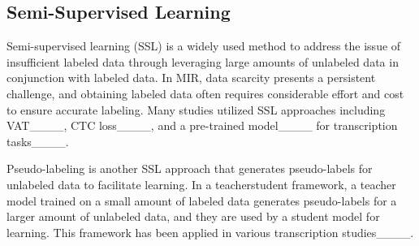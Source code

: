 \subsection{Semi-Supervised Learning}
Semi-supervised learning (SSL) is a widely used method to address the issue of insufficient labeled data through leveraging large amounts of unlabeled data in conjunction with labeled data. 
In MIR, data scarcity presents a persistent challenge, and obtaining labeled data often requires considerable effort and cost to ensure accurate labeling. Many studies utilized SSL approaches including VAT____, CTC loss____, and a pre-trained model____ for transcription tasks____.

Pseudo-labeling is another SSL approach that generates pseudo-labels for unlabeled data to facilitate learning. In a teacher\textendash student framework, a teacher model trained on a small amount of labeled data generates pseudo-labels for a larger amount of unlabeled data, and they are used by a student model for learning. This framework has been applied in various transcription studies____.